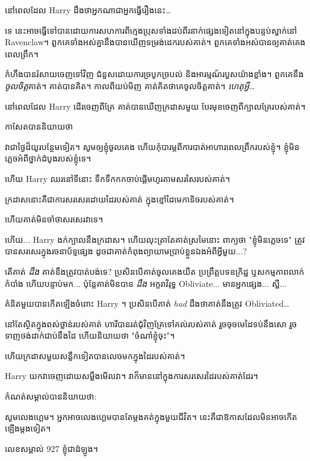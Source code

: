 នៅពេលដែល Harry ដឹងថាអ្នកណាជាអ្នកធ្វើរឿងនេះ…

ទេ នេះ​អាច​ធ្វើ​ទៅ​បាន​ដោយ​ការ​សហការ​ពី​ក្មេង​ប្រុស​ទាំង​ដប់ពីរ​នាក់​ផ្សេង​ទៀត​នៅ​ក្នុង​បន្ទប់​ស្នាក់​នៅ Ravenclaw។ ពួកគេទាំងអស់គ្នានឹងបានឃើញទម្រង់ដេករបស់គាត់។ ពួកគេ​ទាំង​អស់​បាន​ឲ្យ​គាត់​គេង​ពេល​ព្រឹក។

កំហឹង​បាន​រំសាយ​ចេញ​ទៅ​វិញ ជំនួស​ដោយ​ការ​ច្របូកច្របល់ និង​អារម្មណ៍​របួស​យ៉ាង​ខ្លាំង។ ពួកគេនឹង\emph{ចូលចិត្ត}គាត់។ គាត់បានគិត។ កាល​ពី​យប់​មិញ គាត់​គិត​ថា​គេ​ចូល​ចិត្ត​គាត់។ \emph{ហេតុអ្វី…}

នៅពេលដែល Harry ដើរចេញពីគ្រែ គាត់បានឃើញក្រដាសមួយ បែរមុខចេញពីក្បាលគ្រែរបស់គាត់។

កាសែតបាននិយាយថា

\begin{writtenNote}

វា​ជា​ថ្ងៃ​ដ៏​យូរ​បន្ថែម​ទៀត។ សូម​ឲ្យ​ខ្ញុំ​ចូល​គេង ហើយ​កុំ​បារម្ភ​ពី​ការ​បាត់​អាហារ​ពេល​ព្រឹក​របស់​ខ្ញុំ។ ខ្ញុំមិនភ្លេចអំពីថ្នាក់ដំបូងរបស់ខ្ញុំទេ។

\end{writtenNote}

ហើយ Harry ឈរនៅទីនោះ ទឹកទឹកកកចាប់ផ្តើមហូរតាមសរសៃរបស់គាត់។

ក្រដាស​នោះ​គឺ​ជា​ការ​សរសេរ​ដោយ​ដៃ​របស់​គាត់ ក្នុង​ខ្មៅ​ដៃ​មេកានិច​របស់​គាត់។

ហើយគាត់មិនចាំថាសរសេរវាទេ។

ហើយ... Harry ងក់ក្បាលនឹងក្រដាស។ ហើយលុះត្រាតែគាត់ស្រមៃនោះ ពាក្យថា "ខ្ញុំមិនភ្លេចទេ" ត្រូវបានសរសេរក្នុងរចនាប័ទ្មផ្សេង ដូចជាគាត់កំពុងព្យាយាមប្រាប់ខ្លួនឯងអំពីអ្វីមួយ...?

តើគាត់ \emph{ដឹង} គាត់នឹងត្រូវបាត់បង់ទេ? ប្រសិនបើគាត់ចូលគេងយឺត ប្រព្រឹត្តបទឧក្រិដ្ឋ ឬសកម្មភាពលាក់កំបាំង ហើយបន្ទាប់មក... ប៉ុន្តែគាត់មិនបាន \emph{ដឹង} អក្ខរាវិរុទ្ធ Obliviate... មានអ្នកផ្សេង... ស្អី...

គំនិតមួយបានកើតឡើងចំពោះ Harry ។ ប្រសិនបើគាត់ \emph{had} ដឹងថាគាត់នឹងត្រូវ Obliviated…

នៅ​តែ​ស្ថិត​ក្នុង​ពស់​ថ្លាន់​របស់​គាត់ ហារី​បាន​រត់​ជុំវិញ​គ្រែ​ទៅ​គល់​របស់​គាត់ រួច​ចុច​មេដៃ​ទប់​នឹង​សោ រួច​ទាញ​ថង់​ដាក់​ជាប់​នឹង​ដៃ ហើយ​និយាយ​ថា "ចំណាំ​ខ្ញុំ​ចុះ"។

ហើយ​ក្រដាស​មួយ​សន្លឹក​ទៀត​បាន​លេច​មក​ក្នុង​ដៃ​របស់​គាត់។

Harry យកវាចេញដោយសម្លឹងមើលវា។ វា​ក៏​មាន​នៅ​ក្នុង​ការ​សរសេរ​ដៃ​របស់​គាត់​ដែរ។

កំណត់សម្គាល់បាននិយាយថា:

\begin{writtenNote}

សូមលេងហ្គេម។ អ្នកអាចលេងហ្គេមបានតែម្តងគត់ក្នុងមួយជីវិត។ នេះគឺជាឱកាសដែលមិនអាចកើតឡើងម្តងទៀត។

លេខសម្គាល់ 927 ខ្ញុំជាដំឡូង។

\end{writtenNote}


